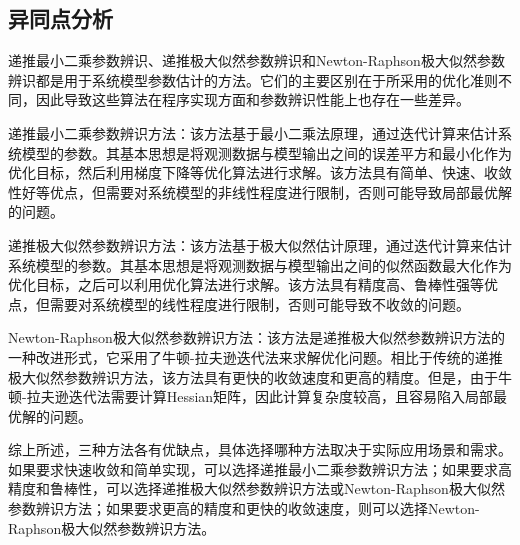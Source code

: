 \documentclass[UTF8, twocolumn]{article}
\begin{document}
\subsection{异同点分析}
递推最小二乘参数辨识、递推极大似然参数辨识和Newton-Raphson极大似然参数辨识都是用于系统模型参数估计的方法。它们的主要区别在于所采用的优化准则不同，因此导致这些算法在程序实现方面和参数辨识性能上也存在一些差异。

递推最小二乘参数辨识方法：该方法基于最小二乘法原理，通过迭代计算来估计系统模型的参数。其基本思想是将观测数据与模型输出之间的误差平方和最小化作为优化目标，然后利用梯度下降等优化算法进行求解。该方法具有简单、快速、收敛性好等优点，但需要对系统模型的非线性程度进行限制，否则可能导致局部最优解的问题。

递推极大似然参数辨识方法：该方法基于极大似然估计原理，通过迭代计算来估计系统模型的参数。其基本思想是将观测数据与模型输出之间的似然函数最大化作为优化目标，之后可以利用优化算法进行求解。该方法具有精度高、鲁棒性强等优点，但需要对系统模型的线性程度进行限制，否则可能导致不收敛的问题。

Newton-Raphson极大似然参数辨识方法：该方法是递推极大似然参数辨识方法的一种改进形式，它采用了牛顿-拉夫逊迭代法来求解优化问题。相比于传统的递推极大似然参数辨识方法，该方法具有更快的收敛速度和更高的精度。但是，由于牛顿-拉夫逊迭代法需要计算Hessian矩阵，因此计算复杂度较高，且容易陷入局部最优解的问题。

综上所述，三种方法各有优缺点，具体选择哪种方法取决于实际应用场景和需求。如果要求快速收敛和简单实现，可以选择递推最小二乘参数辨识方法；如果要求高精度和鲁棒性，可以选择递推极大似然参数辨识方法或Newton-Raphson极大似然参数辨识方法；如果要求更高的精度和更快的收敛速度，则可以选择Newton-Raphson极大似然参数辨识方法。

%
\end{document}
